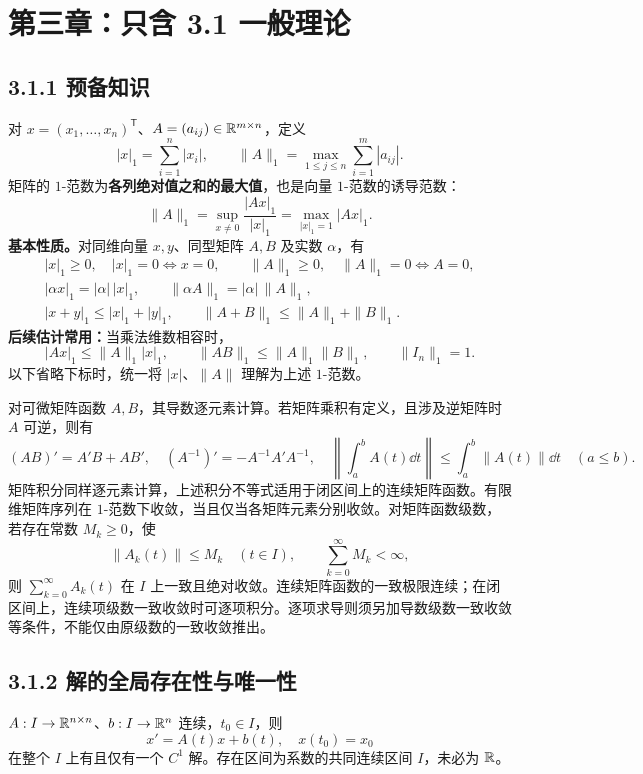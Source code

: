 \section{第三章：只含 3.1 一般理论}
\subsection*{3.1.1 预备知识}
对 $x=(x_1,\ldots,x_n)^{\mathsf T}$、$A=(a_{ij})\in\mathbb R^{m\times n}$，定义
\[
\boxed{|x|_1=\sum_{i=1}^n|x_i|,\qquad
\|A\|_1=\max_{1\le j\le n}\sum_{i=1}^m|a_{ij}|.}
\]
矩阵的 $1$-范数为\textbf{各列绝对值之和的最大值}，也是向量 $1$-范数的诱导范数：
\[
\|A\|_1=\sup_{x\ne0}\frac{|Ax|_1}{|x|_1}
=\max_{|x|_1=1}|Ax|_1.
\]
\textbf{基本性质。}对同维向量 $x,y$、同型矩阵 $A,B$ 及实数 $\alpha$，有
\[
\begin{gathered}
|x|_1\ge0,\quad |x|_1=0\iff x=0,\qquad
\|A\|_1\ge0,\quad \|A\|_1=0\iff A=0,\\
|\alpha x|_1=|\alpha|\,|x|_1,\qquad
\|\alpha A\|_1=|\alpha|\,\|A\|_1,\\
|x+y|_1\le|x|_1+|y|_1,\qquad
\|A+B\|_1\le\|A\|_1+\|B\|_1.
\end{gathered}
\]
\textbf{后续估计常用：}当乘法维数相容时，
\[
\boxed{|Ax|_1\le\|A\|_1|x|_1,\qquad
\|AB\|_1\le\|A\|_1\|B\|_1,\qquad \|I_n\|_1=1.}
\]
以下省略下标时，统一将 $|x|$、$\|A\|$ 理解为上述 $1$-范数。

对可微矩阵函数 $A,B$，其导数逐元素计算。若矩阵乘积有定义，且涉及逆矩阵时 $A$ 可逆，则有
\[
(AB)'=A'B+AB',\quad (A^{-1})'=-A^{-1}A'A^{-1},\quad
\left\|\int_a^b A(t)\dd t\right\|\le\int_a^b\|A(t)\|\dd t\quad(a\le b).
\]
矩阵积分同样逐元素计算，上述积分不等式适用于闭区间上的连续矩阵函数。有限维矩阵序列在 $1$-范数下收敛，当且仅当各矩阵元素分别收敛。对矩阵函数级数，若存在常数 $M_k\ge0$，使
\[
\|A_k(t)\|\le M_k\quad(t\in I),\qquad \sum_{k=0}^{\infty}M_k<\infty,
\]
则 $\sum_{k=0}^{\infty}A_k(t)$ 在 $I$ 上一致且绝对收敛。连续矩阵函数的一致极限连续；在闭区间上，连续项级数一致收敛时可逐项积分。逐项求导则须另加导数级数一致收敛等条件，不能仅由原级数的一致收敛推出。

\subsection*{3.1.2 解的全局存在性与唯一性}
\core $A:I\to\mathbb R^{n\times n}$、$b:I\to\mathbb R^n$ 连续，$t_0\in I$，则
\[
x'=A(t)x+b(t),\quad x(t_0)=x_0
\]
在整个 $I$ 上有且仅有一个 $C^1$ 解。存在区间为系数的共同连续区间 $I$，未必为 $\mathbb R$。

